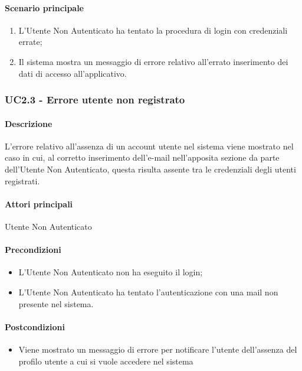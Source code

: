 \paragraph*{Scenario principale}
\begin{enumerate}
  \item L’Utente Non Autenticato ha tentato la procedura di login con credenziali errate;
  \item Il sistema mostra un messaggio di errore relativo all’errato inserimento dei dati di accesso all’applicativo.    
\end{enumerate}


\subsubsection{UC2.3 - Errore utente non registrato}\label{UC2point3}
\paragraph*{Descrizione}
L’errore relativo all’assenza di un account utente nel sistema viene mostrato nel caso in cui, al corretto inserimento dell’e-mail nell’apposita sezione da parte dell’Utente Non Autenticato, questa risulta assente tra le credenziali degli utenti registrati.

\paragraph*{Attori principali} Utente Non Autenticato

\paragraph*{Precondizioni}
\begin{itemize}
  \item L’Utente Non Autenticato non ha eseguito il login;
  \item L’Utente Non Autenticato ha tentato l’autenticazione con una mail non presente nel sistema.  
\end{itemize}

\paragraph*{Postcondizioni}
\begin{itemize}
  \item Viene mostrato un messaggio di errore per notificare l’utente dell’assenza del profilo utente a cui si vuole accedere nel sistema
\end{itemize}

